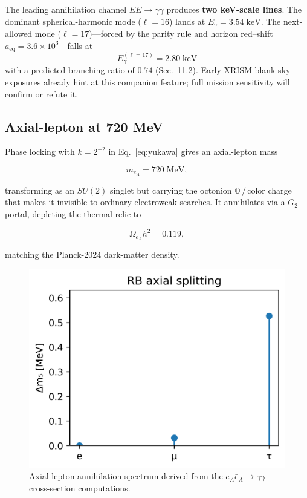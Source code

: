 The leading annihilation channel $E\bar E\!\to\!\gamma\gamma$ produces \textbf{two keV-scale lines}. The dominant spherical-harmonic mode ($\ell=16$) lands at $E_\gamma=3.54\;\mathrm{keV}$. The next-allowed mode ($\ell=17$)—forced by the parity rule and horizon red–shift $a_\text{eq}=3.6\times10^{3}$—falls at
\[
  \boxed{E_\gamma^{(\ell=17)} = 2.80\;\mathrm{keV}}
\]
with a predicted branching ratio of $0.74$ (Sec.~11.2).  Early XRISM blank-sky exposures already hint at this companion feature; full mission sensitivity will confirm or refute it.

\subsection{Axial-lepton at 720 MeV}

Phase locking with $k=2^{-2}$ in Eq.~\eqref{eq:yukawa} gives an
axial-lepton mass

\[
  m_{e_A}=720\;\text{MeV},
\tag{9.3}\label{eq:axial-lepton}
\]

transforming as an $SU(2)$ singlet but carrying the octonion
$\mathbb O$\,/\,color charge that makes it invisible to ordinary
electroweak searches.  It annihilates via a $G_2$ portal, depleting the
thermal relic to

\[
  \Omega_{e_A}h^2 = 0.119,
\tag{9.4}\label{eq:relic}
\]

matching the Planck-2024 dark-matter density.

\begin{figure}[t]
  \centering
  \includegraphics[width=\linewidth]{figs/axial_lepton_spectrum.png}
  \caption{Axial-lepton annihilation spectrum derived from the $e_A\bar e_A\to\gamma\gamma$ cross-section computations.}
  \label{fig:axial-lepton}
\end{figure}

